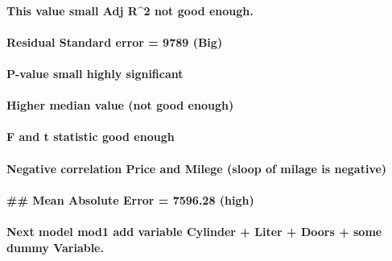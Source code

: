 \documentclass[
]{article}
\begin{document}
\hypertarget{this-value-small-adj-r2-not-good-enough.}{%
\paragraph{This value small Adj R\^{}2 not good
enough.}\label{this-value-small-adj-r2-not-good-enough.}}

\hypertarget{residual-standard-error-9789-big}{%
\paragraph{Residual Standard error = 9789
(Big)}\label{residual-standard-error-9789-big}}

\hypertarget{p-value-small-highly-significant}{%
\paragraph{P-value small highly
significant}\label{p-value-small-highly-significant}}

\hypertarget{higher-median-value-not-good-enough}{%
\paragraph{Higher median value (not good
enough)}\label{higher-median-value-not-good-enough}}

\hypertarget{f-and-t-statistic-good-enough}{%
\paragraph{F and t statistic good
enough}\label{f-and-t-statistic-good-enough}}

\hypertarget{negative-correlation-price-and-milege-sloop-of-milage-is-negative}{%
\paragraph{Negative correlation Price and Milege (sloop of milage is
negative)}\label{negative-correlation-price-and-milege-sloop-of-milage-is-negative}}

\hypertarget{mean-absolute-error-7596.28-high}{%
\paragraph{\#\# Mean Absolute Error = 7596.28
(high)}\label{mean-absolute-error-7596.28-high}}

\hypertarget{next-model-mod1-add-variable-cylinder-liter-doors-some-dummy-variable.}{%
\paragraph{Next model mod1 add variable Cylinder + Liter + Doors + some
dummy
Variable.}\label{next-model-mod1-add-variable-cylinder-liter-doors-some-dummy-variable.}}
\end{document}
